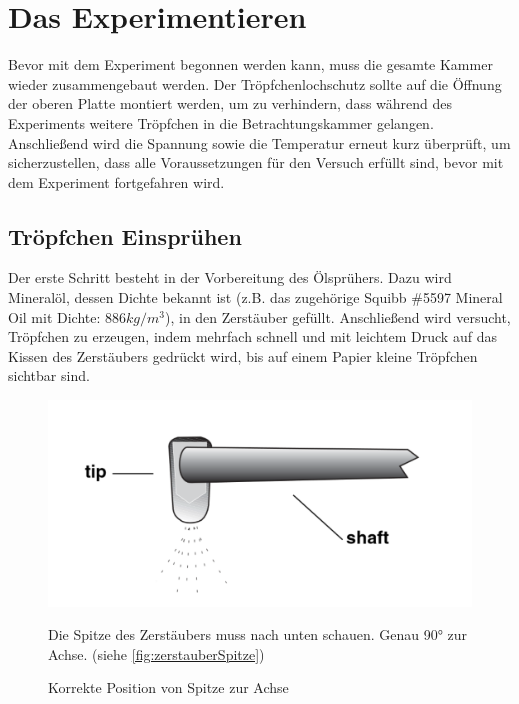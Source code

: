 \section{Das Experimentieren}\label{sec:durchfuehrung}
Bevor mit dem Experiment begonnen werden kann, muss die gesamte Kammer wieder zusammengebaut werden. Der Tröpfchenlochschutz sollte auf die Öffnung der oberen Platte montiert werden, um zu verhindern, dass während des Experiments weitere Tröpfchen in die Betrachtungskammer gelangen. Anschließend wird die Spannung sowie die Temperatur erneut kurz überprüft, um sicherzustellen, dass alle Voraussetzungen für den Versuch erfüllt sind, bevor mit dem Experiment fortgefahren wird.

\subsection{Tröpfchen Einsprühen}\label{sub:tröpfchensprühen}
Der erste Schritt besteht in der Vorbereitung des Ölsprühers. Dazu wird Mineralöl, dessen Dichte bekannt ist (z.B. das zugehörige Squibb \#5597 Mineral Oil mit Dichte: $886 kg/m^3$), in den Zerstäuber gefüllt. Anschließend wird versucht, Tröpfchen zu erzeugen, indem mehrfach schnell und mit leichtem Druck auf das Kissen des Zerstäubers gedrückt wird, bis auf einem Papier kleine Tröpfchen sichtbar sind.
\begin{figure}[h]
	\begin{minipage}[t]{0.45\textwidth}
		\centering
		\includegraphics[width=\textwidth]{bilder/pdf/zerstauberSpitze.pdf}
		\caption{Korrekte Position von Spitze zur Achse \parencite[7]{instructionManualHalogen}}
		\label{fig:zerstauberSpitze}
	\end{minipage}
	\hfill
	\begin{minipage}[t]{0.45\textwidth}
		Die Spitze des Zerstäubers muss nach unten schauen. Genau 90° zur Achse. (siehe \autoref{fig:zerstauberSpitze})
	\end{minipage} 
\end{figure}

